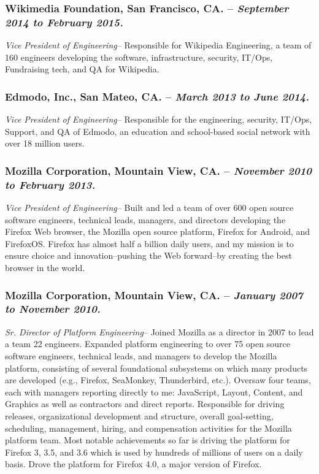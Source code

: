\documentclass[10pt]{report}
\begin{document}
\subsubsection*{Wikimedia Foundation, San Francisco, CA. -- \emph{September 2014
to February 2015. }} \emph{Vice President of Engineering--} Responsible for
Wikipedia Engineering, a team of 160 engineers developing the software,
infrastructure, security, IT/Ops, Fundraising tech, and QA for Wikipedia.

\subsubsection*{Edmodo, Inc., San Mateo, CA. -- \emph{March 2013 to June 2014.
}} \emph{Vice President of Engineering--} Responsible for the engineering,
security, IT/Ops, Support, and QA of Edmodo, an education and school-based
social network with over 18 million users.

\subsubsection*{Mozilla Corporation, Mountain View, CA. -- \emph{November 2010
to February 2013. }} \emph{Vice President of Engineering--} Built and led a team
of over 600 open source software engineers, technical leads, managers, and
directors developing the Firefox Web browser, the Mozilla open source platform,
Firefox for Android, and FirefoxOS.  Firefox has almost half a billion daily
users, and my mission is to ensure choice and innovation--pushing the Web
forward--by creating the best browser in the world.

\subsubsection*{Mozilla Corporation, Mountain View, CA. -- \emph{January 2007 to
November 2010. }} \emph{Sr. Director of Platform Engineering--} Joined Mozilla
as a director in 2007 to lead a team 22 engineers.  Expanded platform
engineering to over 75 open source software engineers, technical leads, and
managers to develop the Mozilla platform, consisting of several foundational
subsystems on which many products are developed (e.g., Firefox, SeaMonkey,
Thunderbird, etc.).  Oversaw four teams, each with managers reporting directly
to me:  JavaScript, Layout, Content, and Graphics as well as contractors and
direct reports.  Responsible for driving releases, organizational development
and structure, overall goal-setting, scheduling, management, hiring, and
compensation activities for the Mozilla platform team.  Most notable
achievements so far is driving the platform for Firefox 3, 3.5, and 3.6 which is
used by hundreds of millions of users on a daily basis.  Drove the
platform for Firefox 4.0, a major version of Firefox.
\end{document}
